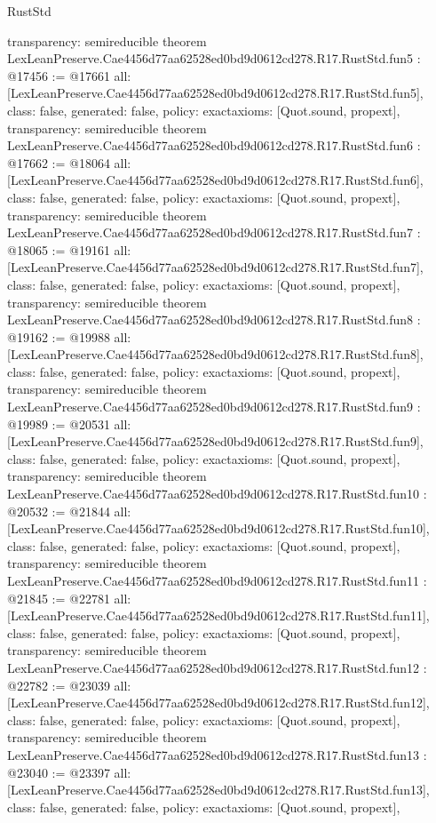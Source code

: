 \begin{lexlean}{RustStd}
\begin{coremodule}
{  transparency: semireducible
}
theorem LexLeanPreserve.Cae4456d77aa62528ed0bd9d0612cd278.R17.RustStd.fun5 : @17456 := @17661 {
  all: [LexLeanPreserve.Cae4456d77aa62528ed0bd9d0612cd278.R17.RustStd.fun5],
  class: false,
  generated: false,
  policy: exact{axioms: [Quot.sound, propext]},
  transparency: semireducible
}
theorem LexLeanPreserve.Cae4456d77aa62528ed0bd9d0612cd278.R17.RustStd.fun6 : @17662 := @18064 {
  all: [LexLeanPreserve.Cae4456d77aa62528ed0bd9d0612cd278.R17.RustStd.fun6],
  class: false,
  generated: false,
  policy: exact{axioms: [Quot.sound, propext]},
  transparency: semireducible
}
theorem LexLeanPreserve.Cae4456d77aa62528ed0bd9d0612cd278.R17.RustStd.fun7 : @18065 := @19161 {
  all: [LexLeanPreserve.Cae4456d77aa62528ed0bd9d0612cd278.R17.RustStd.fun7],
  class: false,
  generated: false,
  policy: exact{axioms: [Quot.sound, propext]},
  transparency: semireducible
}
theorem LexLeanPreserve.Cae4456d77aa62528ed0bd9d0612cd278.R17.RustStd.fun8 : @19162 := @19988 {
  all: [LexLeanPreserve.Cae4456d77aa62528ed0bd9d0612cd278.R17.RustStd.fun8],
  class: false,
  generated: false,
  policy: exact{axioms: [Quot.sound, propext]},
  transparency: semireducible
}
theorem LexLeanPreserve.Cae4456d77aa62528ed0bd9d0612cd278.R17.RustStd.fun9 : @19989 := @20531 {
  all: [LexLeanPreserve.Cae4456d77aa62528ed0bd9d0612cd278.R17.RustStd.fun9],
  class: false,
  generated: false,
  policy: exact{axioms: [Quot.sound, propext]},
  transparency: semireducible
}
theorem LexLeanPreserve.Cae4456d77aa62528ed0bd9d0612cd278.R17.RustStd.fun10 : @20532 := @21844 {
  all: [LexLeanPreserve.Cae4456d77aa62528ed0bd9d0612cd278.R17.RustStd.fun10],
  class: false,
  generated: false,
  policy: exact{axioms: [Quot.sound, propext]},
  transparency: semireducible
}
theorem LexLeanPreserve.Cae4456d77aa62528ed0bd9d0612cd278.R17.RustStd.fun11 : @21845 := @22781 {
  all: [LexLeanPreserve.Cae4456d77aa62528ed0bd9d0612cd278.R17.RustStd.fun11],
  class: false,
  generated: false,
  policy: exact{axioms: [Quot.sound, propext]},
  transparency: semireducible
}
theorem LexLeanPreserve.Cae4456d77aa62528ed0bd9d0612cd278.R17.RustStd.fun12 : @22782 := @23039 {
  all: [LexLeanPreserve.Cae4456d77aa62528ed0bd9d0612cd278.R17.RustStd.fun12],
  class: false,
  generated: false,
  policy: exact{axioms: [Quot.sound, propext]},
  transparency: semireducible
}
theorem LexLeanPreserve.Cae4456d77aa62528ed0bd9d0612cd278.R17.RustStd.fun13 : @23040 := @23397 {
  all: [LexLeanPreserve.Cae4456d77aa62528ed0bd9d0612cd278.R17.RustStd.fun13],
  class: false,
  generated: false,
  policy: exact{axioms: [Quot.sound, propext]},
}
\end{coremodule}
\end{lexlean}
